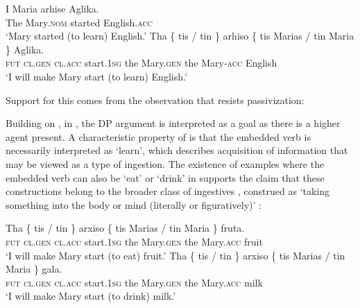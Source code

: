 \documentclass[output=paper]{langscibook}
\begin{document}
\ea \label{alexiadouex:key:8}
    \ea
        \gll I Maria    arhise    Aglika. \\
        The Mary.\textsc{nom}  started    English.\textsc{acc} \\
        \glt ‘Mary started (to learn) English.’
    \ex
        \gll Tha  \{ tis / tin \} arhiso  \{ tis Marias / tin Maria \} Aglika.\\
        \textsc{fut} {} \textsc{cl.gen} {} \textsc{cl.acc} {} start.\textsc{1sg} {} the Mary.\textsc{gen} {} the Mary-\textsc{acc} {} English\\
        \glt `I will make Mary start (to learn) English.'
    \z 
\z

Support for this comes from the observation that  resists passivization:

\z 

Building on \citet{Anagnostopoulou2001}, in , the DP argument is interpreted as a goal as there is a higher agent present. 
A characteristic property of  is that the embedded verb is necessarily interpreted as ‘learn’, 
which describes acquisition of information that may be viewed as a type of ingestion. 
The existence of examples where the embedded verb can also be ‘eat’ or ‘drink’ in  supports the claim 
that these constructions belong to the broader class of ingestives \citep[213--217]{Levin1993}, 
construed as `taking something into the body or mind (literally or figuratively)' \citep[46]{Masica1976}:

\ea%
    \label{alexiadouex:key:9}
    \ea
        \gll Tha  \{ tis / tin \} arxiso \{ tis Marias / tin Maria \} fruta.\\
        \textsc{fut} {} \textsc{cl.gen} {} \textsc{cl.acc} {} start.\textsc{1sg} {} the Mary.\textsc{gen} {} the Mary.\textsc{acc} {} fruit\\
        \glt  ‘I will make Mary start (to eat) fruit.’
    \ex
        \gll Tha \{ tis / tin \} arxiso \{ tis Marias / tin Maria \} gala.\\
        \textsc{fut} {} \textsc{cl.gen} {} \textsc{cl.acc} {} start.\textsc{1sg} {} the Mary.\textsc{gen} {} the Mary.\textsc{acc} {} milk\\
        \glt ‘I will make Mary start (to drink) milk.’
    \z 
\z 
\end{document}

